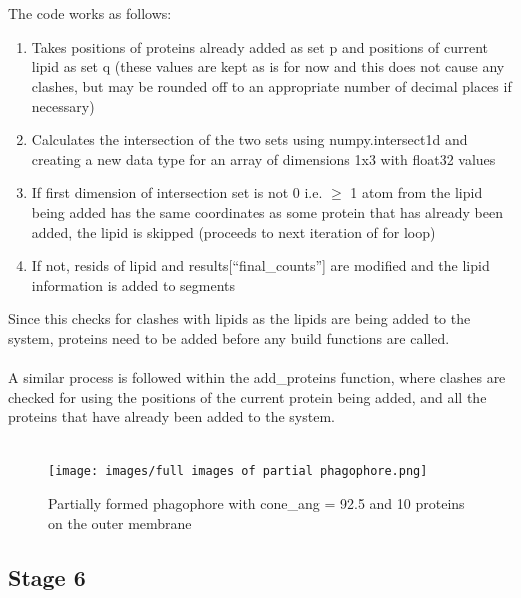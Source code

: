 \documentclass[12pt, a4paper]{report}
\begin{document}
\\~\\
The code works as follows: 
\begin{enumerate}
    \item Takes positions of proteins already added as set p and positions of current lipid as set q (these values are kept as is for now and this does not cause any clashes, but may be rounded off to an appropriate number of decimal places if necessary) 
    \item Calculates the intersection of the two sets using numpy.intersect1d and creating a new data type for an array of dimensions 1x3 with float32 values 
    \item If first dimension of intersection set is not 0 i.e. $\ge$ 1 atom from the lipid being added has the same coordinates as some protein that has already been added, the lipid is skipped (proceeds to next iteration of for loop) 
    \item If not, resids of lipid and results[“final\_counts”] are modified and the lipid information is added to segments 
\end{enumerate} 

Since this checks for clashes with lipids as the lipids are being added to the system, proteins need to be added before any build functions are called. 
\\~\\ 
A similar process is followed within the add\_proteins function, where clashes are checked for using the positions of the current protein being added, and all the proteins that have already been added to the system. 
\\~\\
\begin{figure}[h]
    \texttt{[image: images/full images of partial phagophore.png]} 
    \centering 
    \caption{Partially formed phagophore with cone\_ang = 92.5 \degree and 10 proteins on the outer membrane}
    \centering
\end{figure} 

\subsection*{Stage 6} 
\end{document}
